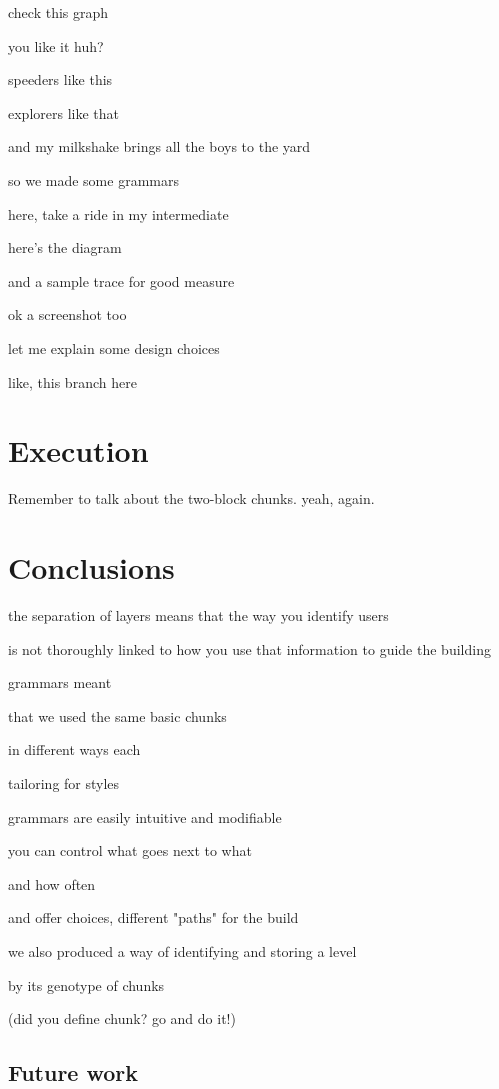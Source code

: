 \documentclass[conference]{IEEEtran}
\begin{document}
check this graph

you like it huh?

speeders like this

explorers like that

and my milkshake brings all the boys to the yard

so we made some grammars

here, take a ride in my intermediate

here's the diagram

and a sample trace for good measure

ok a screenshot too

let me explain some design choices

like, this branch here

\section{Execution}

Remember to talk about the two-block chunks. yeah, again.

\section{Conclusions}

the separation of layers means that the way you identify users

is not thoroughly linked to how you use that information to guide the building

grammars meant

that we used the same basic chunks

in different ways each

tailoring for styles

grammars are easily intuitive and modifiable

you can control what goes next to what

and how often

and offer choices, different "paths" for the build

we also produced a way of identifying and storing a level

by its genotype of chunks

(did you define chunk? go and do it!)

\subsection*{Future work}
\end{document}
